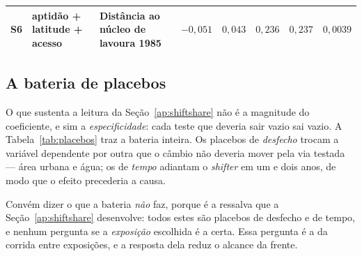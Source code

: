 \begin{table}[!ht]
\begin{tabular}{lp{3.5cm}p{3.1cm}ccccc}
S6 & aptidão + latitude + acesso & Distância ao núcleo de lavoura 1985 & $-0{,}051$ & $0{,}043$ & $0{,}236$ & $0{,}237$ & $0{,}0039$ \\
\bottomrule
\end{tabular}
\end{table}

\FloatBarrier

\subsection{A bateria de placebos}

O que sustenta a leitura da Seção~\ref{ap:shiftshare} não é a magnitude do
coeficiente, e sim a \emph{especificidade}: cada teste que deveria sair vazio
sai vazio. A Tabela~\ref{tab:placebos} traz a bateria inteira. Os placebos de
\emph{desfecho} trocam a variável dependente por outra que o câmbio não deveria
mover pela via testada --- área urbana e água; os de \emph{tempo} adiantam o
\emph{shifter} em um e dois anos, de modo que o efeito precederia a causa.

Convém dizer o que a bateria \emph{não} faz, porque é a ressalva que a
Seção~\ref{ap:shiftshare} desenvolve: todos estes são placebos de desfecho e de
tempo, e nenhum pergunta se a \emph{exposição} escolhida é a certa. Essa
pergunta é a da corrida entre exposições, e a resposta dela reduz o alcance da
frente.


